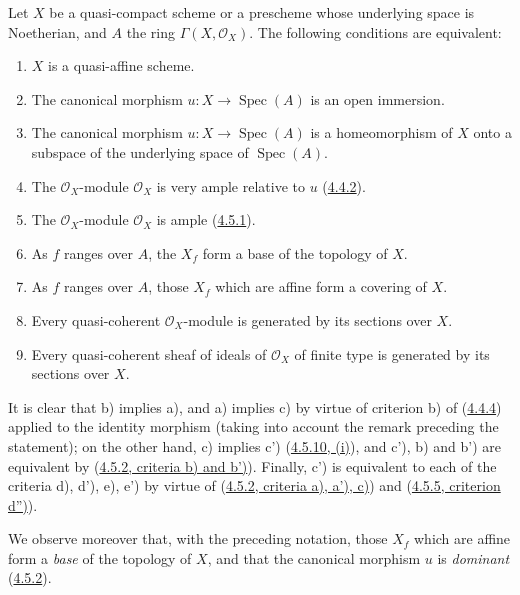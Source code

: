 \begin{proposition}[5.1.2]
\label{II.5.1.2}
Let $X$ be a quasi-compact scheme or a prescheme whose underlying space
is Noetherian, and $A$ the ring $\Gamma(X,\mathcal{O}_X)$. The following
conditions are equivalent:
\begin{enumerate}
  \item[\rm{a)}] $X$ is a quasi-affine scheme.
  \item[\rm{b)}] The canonical morphism
  $u:X\to\operatorname{Spec}(A)$ is an open immersion.
  \item[\rm{b')}] The canonical morphism
  $u:X\to\operatorname{Spec}(A)$ is a homeomorphism of $X$ onto a
  subspace of the underlying space of $\operatorname{Spec}(A)$.
  \item[\rm{c)}] The $\mathcal{O}_X$-module $\mathcal{O}_X$ is very ample
  relative to $u$ (\hyperref[II.4.4.2]{4.4.2}).
  \item[\rm{c')}] The $\mathcal{O}_X$-module $\mathcal{O}_X$ is ample
  (\hyperref[II.4.5.1]{4.5.1}).
  \item[\rm{d)}] As $f$ ranges over $A$, the $X_f$ form a base of the
  topology of $X$.
  \item[\rm{d')}] As $f$ ranges over $A$, those $X_f$ which are affine
  form a covering of $X$.


  \item[\rm{e)}] Every quasi-coherent $\mathcal{O}_X$-module is generated by
  its sections over $X$.
  \item[\rm{e')}] Every quasi-coherent sheaf of ideals of
  $\mathcal{O}_X$ of finite type is generated by its sections over $X$.
\end{enumerate}
\end{proposition}

It is clear that b) implies a), and a) implies c) by virtue of criterion b) of
(\hyperref[II.4.4.4]{4.4.4}) applied to the identity morphism (taking into
account the remark preceding the statement); on the other hand, c) implies c')
(\hyperref[II.4.5.10]{4.5.10, (i)}), and c'), b) and b') are equivalent by
(\hyperref[II.4.5.2]{4.5.2, criteria b) and b')}). Finally, c') is equivalent
to each of the criteria d), d'), e), e') by virtue of
(\hyperref[II.4.5.2]{4.5.2, criteria a), a'), c)}) and
(\hyperref[II.4.5.5]{4.5.5, criterion d'')}).

We observe moreover that, with the preceding notation, those $X_f$ which
are affine form a \emph{base} of the topology of $X$, and that the
canonical morphism $u$ is \emph{dominant}
(\hyperref[II.4.5.2]{4.5.2}).

